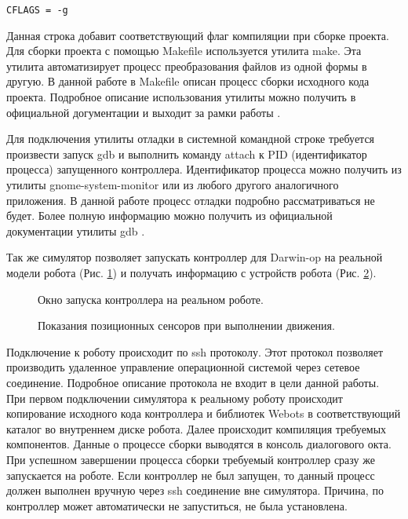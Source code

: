 \lstset{language=[gnu] make}
\begin{lstlisting}
CFLAGS = -g
\end{lstlisting}

Данная строка добавит соответствующий флаг компиляции при сборке проекта. Для сборки проекта с помощью Makefile используется утилита make. Эта утилита автоматизирует процесс преобразования файлов из одной формы в другую. В данной работе в Makefile описан процесс сборки исходного кода проекта. Подробное описание использования утилиты можно получить в официальной догументации и выходит за рамки работы \cite{stallman2006gnu}.

Для подключения утилиты отладки в системной командной строке требуется произвести запуск gdb и выполнить команду attach к PID (идентификатор процесса) запущенного контроллера. Идентификатор процесса можно получить из утилиты gnome-system-monitor или из любого другого аналогичного приложения. В данной работе процесс отладки подробно рассматриваться не будет. Более полную информацию можно получить из официальной документации утилиты gdb \cite{stallman1992gdb}.

Так же симулятор позволяет запускать контроллер для Darwin-op на реальной модели робота (Рис. \ref{im:1_webots_transfer}) и получать информацию с устройств робота (Рис. \ref{im:1_webots_position_sensors}).

\begin{figure}[h]
\caption{Окно запуска контроллера на реальном роботе.}
\label{im:1_webots_transfer}
\end{figure}

\begin{figure}[h]
\caption{Показания позиционных сенсоров при выполнении движения.}
\label{im:1_webots_position_sensors}
\end{figure}


Подключение к роботу происходит по ssh протоколу. Этот протокол позволяет производить удаленное управление операционной системой через сетевое соединение. Подробное описание протокола не входит в цели данной работы. При первом подключении симулятора к реальному роботу происходит копирование исходного кода контроллера и библиотек Webots в соответствующий каталог во внутреннем диске робота. Далее происходит компиляция требуемых компонентов. Данные о процессе сборки выводятся в консоль диалогового окта. При успешном завершении процесса сборки требуемый контроллер сразу же запускается на роботе. Если контроллер не был запущен, то данный процесс должен выполнен вручную через ssh соединение вне симулятора. Причина, по контроллер может автоматически не запуститься, не была установлена.

